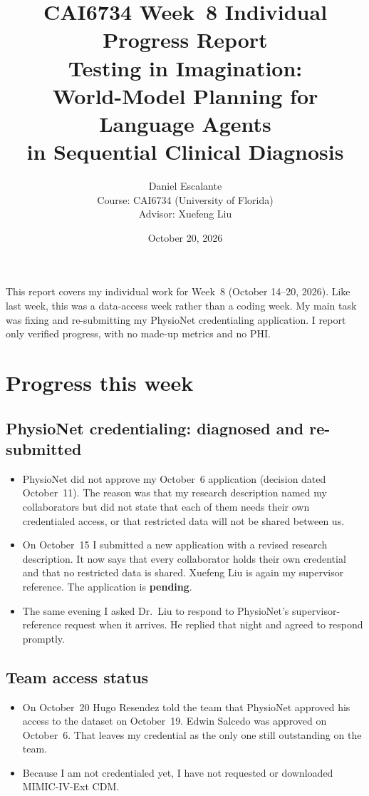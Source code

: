 \documentclass[11pt,letterpaper]{article}
\title{\textbf{CAI6734 Week~8 Individual Progress Report}\\[0.35em]
\large Testing in Imagination:\\
World-Model Planning for Language Agents\\
in Sequential Clinical Diagnosis}
\author{Daniel Escalante\\[0.4em]
\small Course: CAI6734 (University of Florida)\\
Advisor: Xuefeng Liu}
\date{October 20, 2026}
\begin{document}
\maketitle
\thispagestyle{empty}

\noindent
This report covers my individual work for Week~8 (October 14--20, 2026). Like last week, this was a data-access week rather than a coding week. My main task was fixing and re-submitting my PhysioNet credentialing application. I report only verified progress, with no made-up metrics and no PHI.

\section{Progress this week}

\subsection{PhysioNet credentialing: diagnosed and re-submitted}
\begin{itemize}
  \item PhysioNet did not approve my October~6 application (decision dated October~11). The reason was that my research description named my collaborators but did not state that each of them needs their own credentialed access, or that restricted data will not be shared between us.
  \item On October~15 I submitted a new application with a revised research description. It now says that every collaborator holds their own credential and that no restricted data is shared. Xuefeng Liu is again my supervisor reference. The application is \textbf{pending}.
  \item The same evening I asked Dr.~Liu to respond to PhysioNet's supervisor-reference request when it arrives. He replied that night and agreed to respond promptly.
\end{itemize}

\subsection{Team access status}
\begin{itemize}
  \item On October~20 Hugo Resendez told the team that PhysioNet approved his access to the dataset on October~19. Edwin Salcedo was approved on October~6. That leaves my credential as the only one still outstanding on the team.
  \item Because I am not credentialed yet, I have not requested or downloaded MIMIC-IV-Ext CDM.
\end{itemize}
\end{document}
